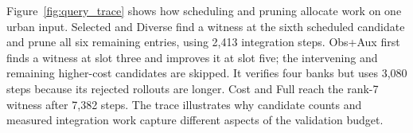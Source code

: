 Figure~\ref{fig:query_trace} shows how scheduling and pruning allocate work on one urban input. Selected and Diverse find a witness at the sixth scheduled candidate and prune all six remaining entries, using 2,413 integration steps. Obs+Aux first finds a witness at slot three and improves it at slot five; the intervening and remaining higher-cost candidates are skipped. It verifies four banks but uses 3,080 steps because its rejected rollouts are longer. Cost and Full reach the rank-7 witness after 7,382 steps. The trace illustrates why candidate counts and measured integration work capture different aspects of the validation budget.
